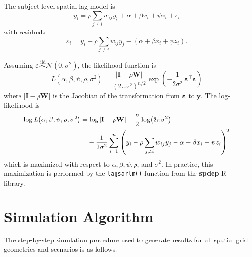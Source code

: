 \documentclass{article}[11pt]
\begin{document}
The subject-level spatial lag model is
\begin{equation}
    y_i = \rho \sum_{j \neq i} w_{ij} y_j + \alpha + \beta x_i + \psi z_i + \epsilon_i
\end{equation}
with residuals
\begin{equation}
    \varepsilon_i = y_i - \rho \sum_{j \neq i} w_{ij} y_j - \left(\alpha + \beta x_i + \psi z_i\right).
\end{equation}

Assuming $\varepsilon_i \overset{\text{iid}}{\sim} \mathcal{N}(0,\sigma^2)$, the likelihood function is
\begin{equation}
    L\!\left(\alpha,\beta,\psi,\rho,\sigma^2\right)
    = \frac{|\mathbf{I} - \rho\mathbf{W}|}{\left(2\pi\sigma^2\right)^{n/2}}
      \exp\!\left(-\frac{1}{2\sigma^2}\,\boldsymbol{\varepsilon}^{\top}\boldsymbol{\varepsilon}\right)
\end{equation}
where $|\mathbf{I}-\rho\mathbf{W}|$ is the Jacobian of the transformation from $\boldsymbol{\varepsilon}$ to $\mathbf{y}$. The log-likelihood is
\begin{align}
    \log L\!\left(\alpha,\beta,\psi,\rho,\sigma^2\right)
    &= \log|\mathbf{I} - \rho\mathbf{W}|
       - \frac{n}{2}\log\!\left(2\pi\sigma^2\right) \notag \\
    &\quad - \frac{1}{2\sigma^2}
        \sum_{i=1}^{n}
        \left(y_i - \rho\sum_{j \neq i}w_{ij}y_j - \alpha - \beta x_i - \psi z_i\right)^{\!2}
\end{align}
which is maximized with respect to $\alpha, \beta, \psi, \rho$, and $\sigma^2$. In practice, this maximization is performed by the \texttt{lagsarlm()} function from the \textbf{spdep} R library\cite{bivand_r_2022}.

\section{Simulation Algorithm}\label{appendix:SimAlgorithm}

The step-by-step simulation procedure used to generate results for all spatial grid geometries and scenarios is as follows.
\end{document}

